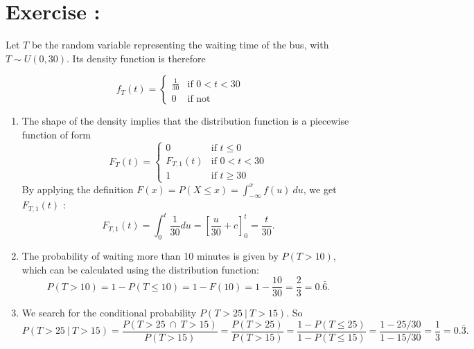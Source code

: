 \documentclass[12pt,thmsa]{article}
\begin{document}
\bigskip


\addtocounter{section}{1}
\section*{Exercise \thesection:}

Let $T$ be the random variable representing the waiting time of the bus, with $T \sim U(0,30)$. Its density function is therefore 

\begin{equation*}
  f_T(t) = \left\{ 
    \begin{array}{ll}
      \frac{1}{30} & \text{if } 0 < t < 30 \\
      0 & \text{if not}
    \end{array}
  \right.
\end{equation*}
\medskip

\begin{enumerate}%
\item The shape of the density implies that the distribution function is a piecewise function of form 
  \begin{equation*}
    F_T(t) = \left\{
      \begin{array}{ll}
        0 & \text{if } t \le 0 \\
        F_{T,1}(t) & \text{if } 0 < t < 30 \\
        1 & \text{if } t \ge 30
      \end{array}
      \right.
  \end{equation*}
  By applying the definition $F(x)=P(X \le x)=\int_{-\infty}^x f(u)
  \ du$, we get $F_{T,1}(t)$ :
  \begin{equation*}
    F_{T,1}(t) = 
    \int_{0}^{t} \frac{1}{30} du =
    \left[ \frac{u}{30} + c \right]^{t}_{0} 
    = \frac{t}{30}.
  \end{equation*}
\item The probability of waiting more than 10 minutes is given by $P(T > 10)$, which can be calculated using the distribution function:
  \begin{equation*}
    P(T>10) = 1-P(T \le 10) = 1-F(10) = 1-\frac{10}{30} = \frac{2}{3}
    = {0.\bar{6}}.
  \end{equation*}
\item We search for the conditional probability
  $P(T>25 \ | \ T>15)$. So
  \begin{equation*}
    P(T>25 \ | \ T>15) = \frac{P(T>25 \ \cap \ T>15)}{P(T>15)} =  
    \frac{P(T>25)}{P(T>15)} = \frac{1-P(T\le25)}{1-P(T\le15)} = 
    \frac{1-25/30}{1-15/30} = \frac{1}{3} ={0.\bar{3}}.
  \end{equation*}
\end{enumerate}
\end{document}
